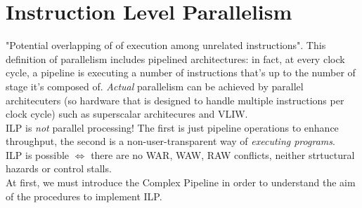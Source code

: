 \documentclass[10pt,a4paper]{article}
\begin{document}
		\section{Instruction Level Parallelism}
			"Potential overlapping of of execution among unrelated instructions". This definition of parallelism includes pipelined architectures: in fact, at every clock cycle, a pipeline is executing a number of instructions that's up to the number of stage it's composed of. \emph{Actual} parallelism can be achieved by parallel architecuters (so hardware that is designed to handle multiple instructions per clock cycle) such as superscalar architecures and VLIW.\\
			ILP is \emph{not} parallel processing! The first is just pipeline operations to enhance throughput, the second is a non-user-transparent way of \emph{executing programs}.\\
			ILP is possible $\Leftrightarrow$ there are no WAR, WAW, RAW conflicts, neither strtuctural hazards or control stalls.\\
			At first, we must introduce the Complex Pipeline in order to understand the aim of the procedures to implement ILP. 
			
\end{document}
